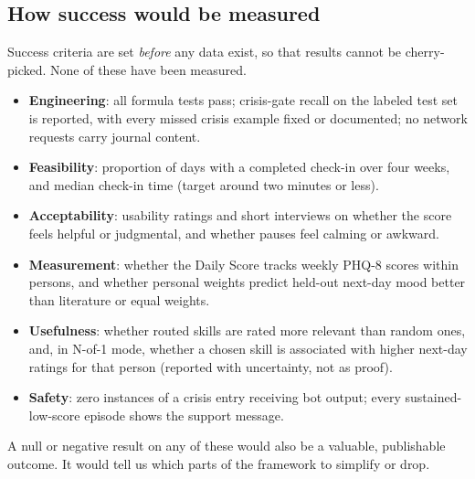\documentclass[11pt]{article}
\begin{document}
\subsection{How success would be measured}
Success criteria are set \emph{before} any data exist, so that results cannot be cherry-picked. None of these have been measured.
\begin{itemize}
\item \textbf{Engineering}: all formula tests pass; crisis-gate recall on the labeled test set is reported, with every missed crisis example fixed or documented; no network requests carry journal content.
\item \textbf{Feasibility}: proportion of days with a completed check-in over four weeks, and median check-in time (target around two minutes or less).
\item \textbf{Acceptability}: usability ratings and short interviews on whether the score feels helpful or judgmental, and whether pauses feel calming or awkward.
\item \textbf{Measurement}: whether the Daily Score tracks weekly PHQ-8 scores within persons, and whether personal weights predict held-out next-day mood better than literature or equal weights.
\item \textbf{Usefulness}: whether routed skills are rated more relevant than random ones, and, in N-of-1 mode, whether a chosen skill is associated with higher next-day ratings for that person (reported with uncertainty, not as proof).
\item \textbf{Safety}: zero instances of a crisis entry receiving bot output; every sustained-low-score episode shows the support message.
\end{itemize}
A null or negative result on any of these would also be a valuable, publishable outcome. It would tell us which parts of the framework to simplify or drop.
\end{document}
